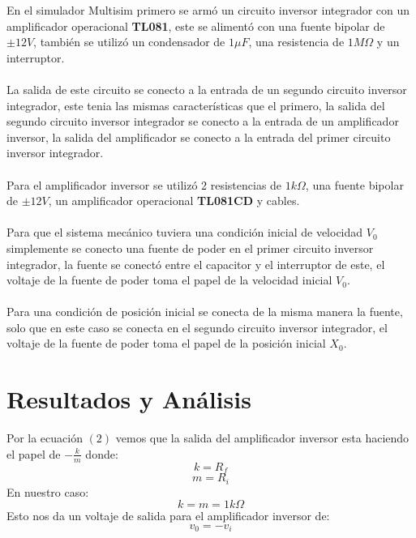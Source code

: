 \documentclass[DIV=calc, paper=a4, fontsize=11pt]{scrartcl}
\begin{document}
\begin{multicols}{2}
En el simulador Multisim primero se armó un circuito inversor integrador con un amplificador operacional \textbf{TL081}, este se alimentó con una fuente bipolar de $\pm 12V$, también se utilizó un condensador de $1 \mu F$, una resistencia de $1 M \Omega$ y un interruptor. 
\\\\
La salida de este circuito se conecto a la entrada de un segundo circuito inversor integrador, este tenia las mismas características que el primero, la salida del segundo circuito inversor integrador se conecto a la entrada de un amplificador inversor, la salida del amplificador se conecto a la entrada del primer circuito inversor integrador.
\\\\Para el amplificador inversor se utilizó 2 resistencias de $1k\Omega$, una fuente bipolar de $\pm 12V$, un amplificador operacional \textbf{TL081CD} y cables.
\\\\
Para que el sistema mecánico tuviera una condición inicial de velocidad $V_{0}$ simplemente se conecto una fuente de poder en el primer circuito inversor integrador, la fuente se conectó entre el capacitor y el interruptor de este, el voltaje de la fuente de poder toma el papel de la velocidad inicial $V_{0}$.
\\\\
Para una condición de posición inicial se conecta de la misma manera la fuente, solo que en este caso se conecta en el segundo circuito inversor integrador, el voltaje de la fuente de poder toma el papel de la posición inicial $X_{0}$.

\section*{Resultados y Análisis}

Por la ecuación $(2)$ vemos que la salida del amplificador inversor esta haciendo el papel de $-\frac{k}{m}$ donde:
$$ k=R_{f} $$
$$ m=R_{i} $$
En nuestro caso:
$$ k=m=1k\Omega $$
Esto nos da un voltaje de salida para el amplificador inversor de:
$$  v_0= - v_i $$


\end{multicols}
\end{document}
